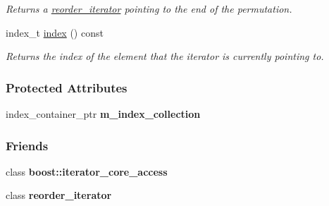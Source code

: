 \begin{DoxyCompactItemize}
\begin{DoxyCompactList}\small\item\em Returns a \hyperlink{classtrsl_1_1reorder__iterator}{reorder\_\-iterator} pointing to the end of the permutation. \item\end{DoxyCompactList}\item 
\hypertarget{classtrsl_1_1reorder__iterator_adf4d6b04596afd49fc45997eb5b5608e}{
index\_\-t \hyperlink{classtrsl_1_1reorder__iterator_adf4d6b04596afd49fc45997eb5b5608e}{index} () const }
\label{classtrsl_1_1reorder__iterator_adf4d6b04596afd49fc45997eb5b5608e}

\begin{DoxyCompactList}\small\item\em Returns the index of the element that the iterator is currently pointing to. \item\end{DoxyCompactList}\end{DoxyCompactItemize}
\subsubsection*{Protected Attributes}
\begin{DoxyCompactItemize}
\item 
\hypertarget{classtrsl_1_1reorder__iterator_a20fcab840b5b397253540d4125ee2638}{
index\_\-container\_\-ptr {\bfseries m\_\-index\_\-collection}}
\label{classtrsl_1_1reorder__iterator_a20fcab840b5b397253540d4125ee2638}

\end{DoxyCompactItemize}
\subsubsection*{Friends}
\begin{DoxyCompactItemize}
\item 
\hypertarget{classtrsl_1_1reorder__iterator_ac09f73e325921cc50ebcd96bed0f8096}{
class {\bfseries boost::iterator\_\-core\_\-access}}
\label{classtrsl_1_1reorder__iterator_ac09f73e325921cc50ebcd96bed0f8096}

\item 
\hypertarget{classtrsl_1_1reorder__iterator_a69bd04fe05ad8b7e3a03a9509db30ffc}{
class {\bfseries reorder\_\-iterator}}
\label{classtrsl_1_1reorder__iterator_a69bd04fe05ad8b7e3a03a9509db30ffc}

\end{DoxyCompactItemize}


